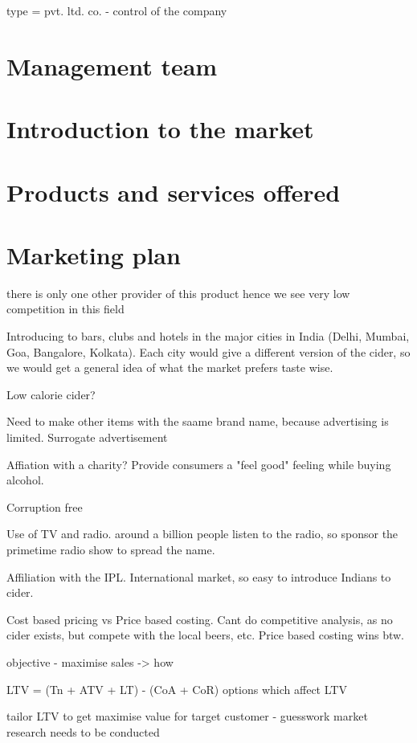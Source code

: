 \documentclass{article}
\begin{document}
type = pvt. ltd. co. - control of the company

\section{Management team}

\section{Introduction to the market}
\section{Products and services offered}
\section{Marketing plan}

there is only one other provider of this product hence we see very low competition in this field 

Introducing to bars, clubs and hotels in the major cities in India (Delhi, Mumbai, Goa,
Bangalore, Kolkata). Each city would give a different version of the cider, so we would
get a general idea of what the market prefers taste wise.

Low calorie cider?

Need to make other items with the saame brand name, because advertising is limited. Surrogate advertisement

Affiation with a charity? Provide consumers a "feel good" feeling while buying alcohol.

Corruption free

Use of TV and radio. around a billion people listen to the radio, so sponsor the primetime radio
show to spread the name.

Affiliation with the IPL. International market, so easy to introduce Indians to cider.

Cost based pricing vs Price based costing. Cant do competitive analysis, as no cider exists, but compete with
the local beers, etc. Price based costing wins btw.



objective - maximise sales -> how

LTV = (Tn + ATV + LT) - (CoA + CoR) 
options which affect LTV

tailor LTV to get maximise value for target customer - guesswork market research
needs to be conducted
\end{document}
